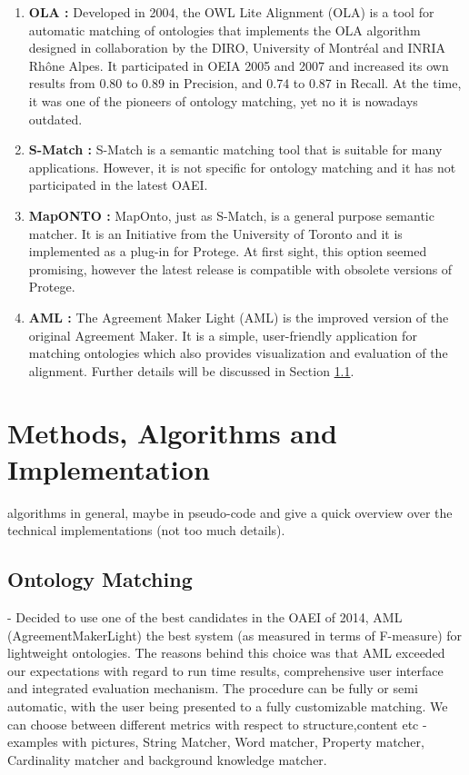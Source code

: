 \documentclass[runningheads,a4paper]{../../StyleFiles/llncs}
\begin{document}
\begin{enumerate}
	\item \textbf{OLA \cite{euzenat2004ontology}:} Developed in 2004, the OWL Lite Alignment (OLA) is a tool for automatic matching of ontologies that implements the OLA algorithm designed in collaboration by the DIRO, University of Montréal and INRIA Rhône Alpes. It participated in OEIA 2005 \cite{euzenat2005ola} and 2007 \cite{djoufak2007ola} and increased its own results from 0.80 to 0.89 in Precision, and 0.74 to 0.87 in Recall. At the time, it was one of the pioneers of ontology matching, yet no it is nowadays outdated.
	\item \textbf{S-Match \cite{giunchiglia2004s}:} S-Match is a semantic matching tool that is suitable for many applications. However, it is not specific for ontology matching and it has not participated in the latest OAEI.
	\item \textbf{MapONTO \cite{an2004refining}:} MapOnto, just as S-Match, is a general purpose semantic matcher. It is an Initiative from the University of Toronto and it is implemented as a plug-in for Protege. At first sight, this option seemed promising, however the latest release is compatible with obsolete versions of Protege. 
	\item \textbf{AML \cite{faria2013agreementmakerlight}:} The Agreement
	Maker Light (AML) is the improved version of the original Agreement Maker. It is a simple, user-friendly application for matching ontologies which also provides visualization and evaluation of the alignment. Further details will be discussed in Section \ref{Ontology_Matching}.
\end{enumerate}

\section{Methods, Algorithms and Implementation}
 algorithms in general, maybe in pseudo-code and give a quick overview over the technical implementations (not too much details).

\subsection{Ontology Matching}
\label{Ontology_Matching}
- Decided to use one of the best candidates in the OAEI of 2014, AML (AgreementMakerLight) the best system (as measured in terms of F-measure) for lightweight ontologies. The reasons behind this choice was that AML exceeded our expectations with regard to run time results, comprehensive user interface and integrated evaluation mechanism. The procedure can be fully or semi automatic, with the user being presented to a fully customizable matching. We can choose between different metrics with respect to structure,content etc 
-examples with pictures, String Matcher, Word matcher, Property matcher, Cardinality matcher and background knowledge matcher.
\end{document}
